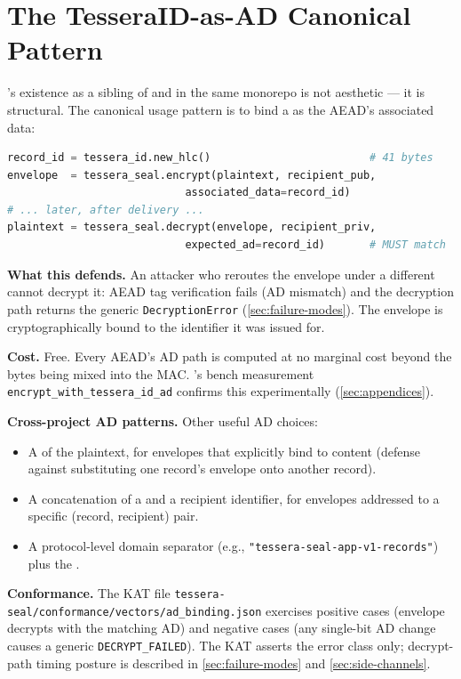 \section{The TesseraID-as-AD Canonical Pattern}
\label{sec:ad-binding}

\pqcrypt{}'s existence as a sibling of \pqid{} and \pqhash{} in the same monorepo is not aesthetic --- it is structural. The canonical usage pattern is to bind a \pqid{} as the AEAD's associated data:

\begin{lstlisting}[language=Python]
record_id = tessera_id.new_hlc()                         # 41 bytes
envelope  = tessera_seal.encrypt(plaintext, recipient_pub,
                            associated_data=record_id)
# ... later, after delivery ...
plaintext = tessera_seal.decrypt(envelope, recipient_priv,
                            expected_ad=record_id)       # MUST match
\end{lstlisting}

\textbf{What this defends.} An attacker who reroutes the envelope under a different \pqid{} cannot decrypt it: AEAD tag verification fails (AD mismatch) and the decryption path returns the generic \texttt{DecryptionError} (\cref{sec:failure-modes}). The envelope is cryptographically bound to the identifier it was issued for.

\textbf{Cost.} Free. Every AEAD's AD path is computed at no marginal cost beyond the bytes being mixed into the MAC. \pqcrypt{}'s bench measurement \texttt{encrypt\_with\_tessera\_id\_ad} confirms this experimentally (\cref{sec:appendices}).

\textbf{Cross-project AD patterns.} Other useful AD choices:
\begin{itemize}
\item A \pqhash{} of the plaintext, for envelopes that explicitly bind to content (defense against substituting one record's envelope onto another record).
\item A concatenation of a \pqid{} and a recipient identifier, for envelopes addressed to a specific (record, recipient) pair.
\item A protocol-level domain separator (e.g., \texttt{"tessera-seal-app-v1-records"}) plus the \pqid{}.
\end{itemize}

\textbf{Conformance.} The KAT file \texttt{tessera-seal/conformance/vectors/ad\_binding.json} exercises positive cases (envelope decrypts with the matching AD) and negative cases (any single-bit AD change causes a generic \texttt{DECRYPT\_FAILED}). The KAT asserts the error class only; decrypt-path timing posture is described in \cref{sec:failure-modes} and \cref{sec:side-channels}.
